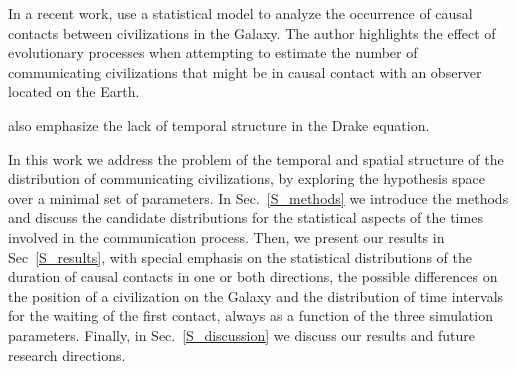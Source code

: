 \documentclass[crop]{CSLB}%
\begin{document}
In a recent work, \citep{Balbi2018} use a statistical model to analyze
the occurrence of causal contacts between civilizations in the Galaxy.
%
The author highlights the effect of evolutionary processes when
attempting to estimate the number of communicating civilizations that
might be in causal contact with an observer located on the Earth.



\citet{cirkovic_temporal_2004} also emphasize the lack of temporal
structure in the Drake equation.






In this work we address the problem of the temporal and spatial
structure of the distribution of communicating civilizations, by
exploring the hypothesis space over a minimal set of parameters.
%
In Sec.~\ref{S_methods} we introduce the methods and discuss the candidate
distributions for the statistical aspects of the times involved in the
communication process.
%
Then, we present our results in Sec~\ref{S_results}, with special emphasis on
the statistical distributions of the duration of causal contacts in one or
both directions, the possible differences on the position of a
civilization on the Galaxy and the distribution of time intervals for
the waiting of the first contact, always as a function of the three
simulation parameters.
%
Finally, in Sec.~\ref{S_discussion} we discuss our results and future research
directions.
\end{document}
